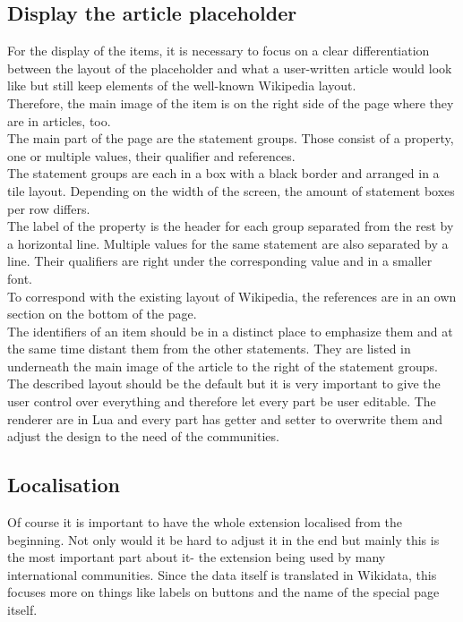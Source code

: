 \documentclass[11pt]{article}
\begin{document}
\subsection{Display the article placeholder}
For the display of the items, it is necessary to focus on a clear differentiation between the layout of the placeholder and what a user-written article would look like but still keep elements of the well-known Wikipedia layout. \\
Therefore, the main image of the item is on the right side of the page where they are in articles, too.\\
The main part of the page are the statement groups. Those consist of a property, one or multiple values, their qualifier and references. \\
The statement groups are each in a box with a black border and arranged in a tile layout. Depending on the width of the screen, the amount of statement boxes per row differs. \\
The label of the property is the header for each group separated from the rest by a horizontal line. Multiple values for the same statement are also separated by a line. Their qualifiers are right under the corresponding value and in a smaller font. \\
To correspond with the existing layout of Wikipedia, the references are in an own section on the bottom of the page. \\
The identifiers of an item should be in a distinct place to emphasize them and at the same time distant them from the other statements. They are listed in underneath the main image of the article to the right of the statement groups. \\
The described layout should be the default but it is very important to give the user control over everything and therefore let every part be user editable. The renderer are in Lua and every part has getter and setter to overwrite them and adjust the design to the need of the communities. \\

\subsection{Localisation}
Of course it is important to have the whole extension localised from the beginning. Not only would it be hard to adjust it in the end but mainly this is the most important part about it- the extension being used by many international communities. Since the data itself is translated in Wikidata, this focuses more on things like labels on buttons and the name of the special page itself. \\
\end{document}
